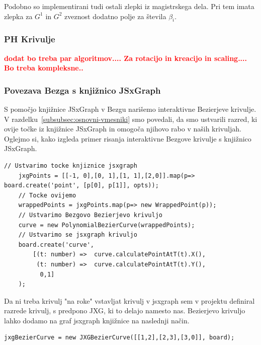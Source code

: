 \documentclass[isrm2, tisk]{fmfdelo}
\newcommand{\mycomment}[1]{\textbf{\textcolor{red}{#1}}}
\begin{document}
    Podobno so implementirani tudi ostali zlepki iz magistrskega dela.
    Pri tem imata zlepka za $G^1$ in $G^2$ zveznost dodatno polje za števila $\beta_i$.
    \subsubsection{PH Krivulje}
    \mycomment{dodat bo treba par algoritmov.... Za rotacijo in kreacijo in scaling.... Bo treba kompleksne..}

    \subsubsection{Povezava Bezga s knjižnico JSxGraph}
    S pomočjo knjižnice JSxGraph v Bezgu narišemo interaktivne Bezierjeve krivulje.
    V razdelku~\ref{subsubsec:osnovni-vmesniki} smo povedali, da smo ustvarili razred, ki ovije točke iz knjižnice JSxGraph in omogoča njihovo rabo v naših krivuljah.
    Oglejmo si, kako izgleda primer risanja interaktivne Bezgove krivulje s knjižnico JSxGraph.
    \begin{lstlisting}[label={lst:ghdfg}]
    // Ustvarimo tocke knjiznice jsxgraph
    jxgPoints = [[-1, 0],[0, 1],[1, 1],[2,0]].map(p=> board.create('point', [p[0], p[1]], opts));
    // Tocke ovijemo
    wrappedPoints = jxgPoints.map(p=> new WrappedPoint(p));
    // Ustvarimo Bezgovo Bezierjevo krivuljo
    curve = new PolynomialBezierCurve(wrappedPoints);
    // Ustvarimo se jsxgraph krivuljo
    board.create('curve',
        [(t: number) =>  curve.calculatePointAtT(t).X(),
         (t: number) =>  curve.calculatePointAtT(t).Y(),
          0,1]
    );
    \end{lstlisting}
    Da ni treba krivulj "na roke" vstavljat krivulj v jsxgraph sem v projektu definiral razrede krivulj, s predpono JXG, ki to delajo namesto nas.
    Bezierjevo krivuljo lahko dodamo na graf jsxgraph knjižnice na naslednji način.
    \begin{lstlisting}[label={lst:ghdfg}]
 jxgBezierCurve = new JXGBezierCurve([[1,2],[2,3],[3,0]], board);
    \end{lstlisting}
\end{document}
